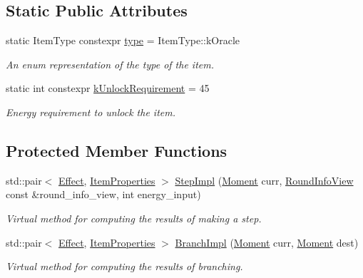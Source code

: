 \subsection*{Static Public Attributes}
\begin{DoxyCompactItemize}
\item 
static Item\+Type constexpr \hyperlink{classitem_1_1_oracle_a6905378f36854ca2ef63d403c95ede8f}{type} = Item\+Type\+::k\+Oracle
\begin{DoxyCompactList}\small\item\em An enum representation of the type of the item. \end{DoxyCompactList}\item 
\mbox{\label{classitem_1_1_oracle_aefa06d76cc06f9a9f5b324806ca3bb37}} 
static int constexpr \hyperlink{classitem_1_1_oracle_aefa06d76cc06f9a9f5b324806ca3bb37}{k\+Unlock\+Requirement} = 45
\begin{DoxyCompactList}\small\item\em Energy requirement to unlock the item. \end{DoxyCompactList}\end{DoxyCompactItemize}
\subsection*{Protected Member Functions}
\begin{DoxyCompactItemize}
\item 
std\+::pair$<$ \hyperlink{classitem_1_1_effect}{Effect}, \hyperlink{classitem_1_1_item_properties}{Item\+Properties} $>$ \hyperlink{classitem_1_1_oracle_af765dd1df5a43de79539f9ce960854c0}{Step\+Impl} (\hyperlink{classtimeplane_1_1_moment}{Moment} curr, \hyperlink{classroundinfo_1_1_round_info_view}{Round\+Info\+View} const \&round\+\_\+info\+\_\+view, int energy\+\_\+input)
\begin{DoxyCompactList}\small\item\em Virtual method for computing the results of making a step. \end{DoxyCompactList}\item 
std\+::pair$<$ \hyperlink{classitem_1_1_effect}{Effect}, \hyperlink{classitem_1_1_item_properties}{Item\+Properties} $>$ \hyperlink{classitem_1_1_oracle_a9a8911eef902d4dcca95f111fda7c5d0}{Branch\+Impl} (\hyperlink{classtimeplane_1_1_moment}{Moment} curr, \hyperlink{classtimeplane_1_1_moment}{Moment} dest)
\begin{DoxyCompactList}\small\item\em Virtual method for computing the results of branching. \end{DoxyCompactList}\end{DoxyCompactItemize}

